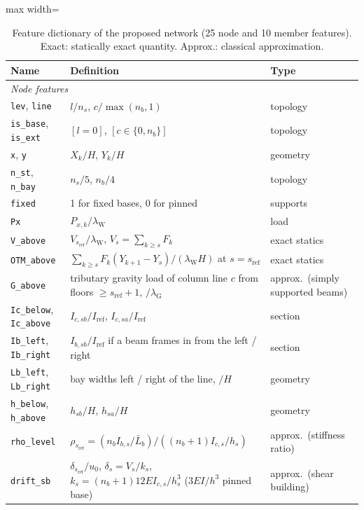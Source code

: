 \begin{table}[h]
\centering
\caption{Feature dictionary of the proposed network (25 node and 10 member features). Exact: statically exact quantity. Approx.: classical approximation.}\label{tab:features}
\scriptsize
\begin{adjustbox}{max width=\textwidth}
\begin{tabular}{lll}
\toprule
Name & Definition & Type \\
\midrule
\multicolumn{3}{l}{\emph{Node features}} \\
\texttt{lev}, \texttt{line} & $l/n_s$, $c/\max(n_b,1)$ & topology \\
\texttt{is\_base}, \texttt{is\_ext} & $[l=0]$, $[c\in\{0,n_b\}]$ & topology \\
\texttt{x}, \texttt{y} & $X_k/H$, $Y_k/H$ & geometry \\
\texttt{n\_st}, \texttt{n\_bay} & $n_s/5$, $n_b/4$ & topology \\
\texttt{fixed} & 1 for fixed bases, 0 for pinned & supports \\
\texttt{Px} & $P_{x,k}/\lambda_\mathrm{W}$ & load \\
\texttt{V\_above} & $V_{s_\mathrm{ref}}/\lambda_\mathrm{W}$, $V_s=\sum_{k\ge s}F_k$ & exact statics \\
\texttt{OTM\_above} & $\sum_{k\ge s}F_k(Y_{k+1}-Y_s)/(\lambda_\mathrm{W}H)$ at $s=s_\mathrm{ref}$ & exact statics \\
\texttt{G\_above} & tributary gravity load of column line $c$ from floors $\ge s_\mathrm{ref}+1$, $/\lambda_\mathrm{G}$ & approx.\ (simply supported beams) \\
\texttt{Ic\_below}, \texttt{Ic\_above} & $I_{c,sb}/I_\mathrm{ref}$, $I_{c,sa}/I_\mathrm{ref}$ & section \\
\texttt{Ib\_left}, \texttt{Ib\_right} & $I_{b,sb}/I_\mathrm{ref}$ if a beam frames in from the left / right & section \\
\texttt{Lb\_left}, \texttt{Lb\_right} & bay widths left / right of the line, $/H$ & geometry \\
\texttt{h\_below}, \texttt{h\_above} & $h_{sb}/H$, $h_{sa}/H$ & geometry \\
\texttt{rho\_level} & $\rho_{s_\mathrm{ref}}=(n_bI_{b,s}/\bar L_b)/((n_b+1)I_{c,s}/h_s)$ & approx.\ (stiffness ratio) \\
\texttt{drift\_sb} & $\delta_{s_\mathrm{ref}}/u_0$, $\delta_s=V_s/k_s$, $k_s=(n_b+1)12EI_{c,s}/h_s^3$ ($3EI/h^3$ pinned base) & approx.\ (shear building) \\

\end{tabular}
\end{adjustbox}
\end{table}
